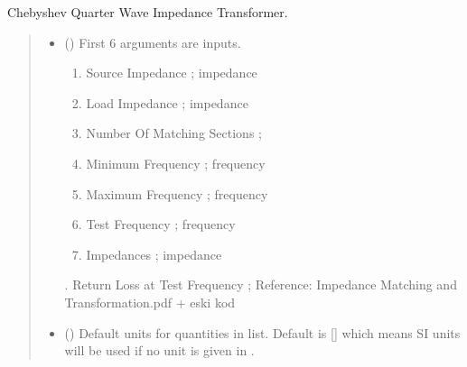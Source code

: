 \documentclass[letterpaper,10pt,english]{sphinxmanual}
\begin{document}

\begin{fulllineitems}
\label{\detokenize{components:components.Chebyshev_QWave_Impedance_Transformer}}
\pysigstartsignatures
{}
\pysigstopsignatures
\sphinxAtStartPar
Chebyshev Quarter Wave Impedance Transformer.
\begin{quote}\begin{description}
\begin{itemize}
\item {}
\sphinxAtStartPar
{} () \textendash{}
\sphinxAtStartPar
First 6 arguments are inputs.
\begin{enumerate}
%
\item {}
\sphinxAtStartPar
Source Impedance ; impedance

\item {}
\sphinxAtStartPar
Load Impedance ; impedance

\item {}
\sphinxAtStartPar
Number Of Matching Sections ;

\item {}
\sphinxAtStartPar
Minimum Frequency ; frequency

\item {}
\sphinxAtStartPar
Maximum Frequency ; frequency

\item {}
\sphinxAtStartPar
Test Frequency ; frequency

\item {}
\sphinxAtStartPar
Impedances ; impedance

\end{enumerate}

.  Return Loss at Test Frequency ;
Reference:  Impedance Matching and Transformation.pdf + eski kod


\item {}
\sphinxAtStartPar
{} (\sphinxstyleliteralemphasis{\sphinxupquote{, }}) \textendash{} Default units for quantities in  list. Default is {[}{]} which means SI units will be used if no unit is given in .


\end{itemize}
\end{description}
\end{quote}
\end{fulllineitems}
\end{document}
